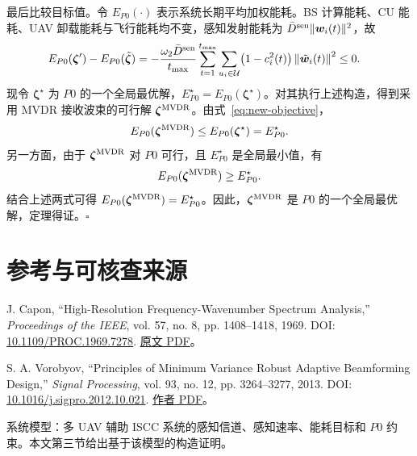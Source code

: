 \documentclass[11pt,a4paper]{ctexart}
\begin{document}
最后比较目标值。令 $E_{P0}(\cdot)$ 表示系统长期平均加权能耗。BS 计算能耗、CU 能耗、UAV 卸载能耗与飞行能耗均不变，感知发射能耗为 $\bar D^{\rm sen}\|\bm w_i(t)\|^2$，故
\begin{align}\label{eq:new-objective}
E_{P0}(\bm\zeta')-E_{P0}(\tilde{\bm\zeta})
&=-\frac{\omega_2\bar D^{\rm sen}}{t_{\max}}\sum_{t=1}^{t_{\max}}\sum_{u_i\in\mathcal U}\bigl(1-c_i^2(t)\bigr)\left\|\tilde{\bm w}_i(t)\right\|^2\le0.
\end{align}
现令 $\bm\zeta^\star$ 为 $P0$ 的一个全局最优解，$E_{P0}^\star=E_{P0}(\bm\zeta^\star)$。对其执行上述构造，得到采用 MVDR 接收波束的可行解 $\bm\zeta^{\rm MVDR}$。由式~\eqref{eq:new-objective}，
\begin{equation}\label{eq:new-opt-upper}
E_{P0}(\bm\zeta^{\rm MVDR})\le E_{P0}(\bm\zeta^\star)=E_{P0}^\star.
\end{equation}
另一方面，由于 $\bm\zeta^{\rm MVDR}$ 对 $P0$ 可行，且 $E_{P0}^\star$ 是全局最小值，有
\begin{equation}\label{eq:new-opt-lower}
E_{P0}(\bm\zeta^{\rm MVDR})\ge E_{P0}^\star.
\end{equation}
结合上述两式可得 $E_{P0}(\bm\zeta^{\rm MVDR})=E_{P0}^\star$。因此，$\bm\zeta^{\rm MVDR}$ 是 $P0$ 的一个全局最优解，定理得证。\hfill$\square$



\section*{参考与可核查来源}
\begin{enumerate}[label={[\arabic*]},leftmargin=*]
\item J. Capon, “High-Resolution Frequency-Wavenumber Spectrum Analysis,” \textit{Proceedings of the IEEE}, vol. 57, no. 8, pp. 1408--1418, 1969. DOI: \href{https://doi.org/10.1109/PROC.1969.7278}{10.1109/PROC.1969.7278}. \href{https://epsc.wustl.edu/~ggeuler/reading/cam_noise_biblio/capon_1969-ieee-high-resolution_frequency-wavenumber_spectrum_analysis.pdf}{原文 PDF}。
\item S. A. Vorobyov, “Principles of Minimum Variance Robust Adaptive Beamforming Design,” \textit{Signal Processing}, vol. 93, no. 12, pp. 3264--3277, 2013. DOI: \href{https://doi.org/10.1016/j.sigpro.2012.10.021}{10.1016/j.sigpro.2012.10.021}. \href{https://users.aalto.fi/~vorobys1/SP13.pdf}{作者 PDF}。
\item 系统模型：多 UAV 辅助 ISCC 系统的感知信道、感知速率、能耗目标和 $P0$ 约束。本文第三节给出基于该模型的构造证明。
\end{enumerate}
\clearpage
\appendix
\end{document}
